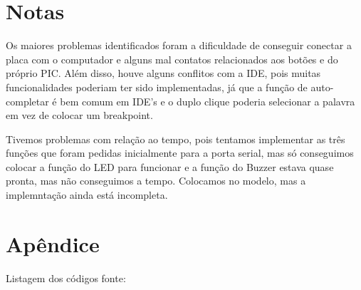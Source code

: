 \documentclass{article}
\begin{document}
\section{Notas}
Os maiores problemas identificados foram a dificuldade de conseguir conectar a placa com o computador e alguns mal contatos relacionados aos botões e do próprio PIC. Além disso, houve alguns conflitos com a IDE, pois muitas funcionalidades poderiam ter sido implementadas, já que a função de auto-completar é bem comum em IDE's e o duplo clique poderia selecionar a palavra em vez de colocar um breakpoint.

Tivemos problemas com relação ao tempo, pois tentamos implementar as três funções que foram pedidas inicialmente para a porta serial, mas só conseguimos colocar a função do LED para funcionar e a função do Buzzer estava quase pronta, mas não conseguimos a tempo. Colocamos no modelo, mas a implemntação ainda está incompleta.


\begin{thebibliography}{widestlabel}
\end{thebibliography}

\section{Apêndice}
Listagem dos códigos fonte:

















\end{document}
